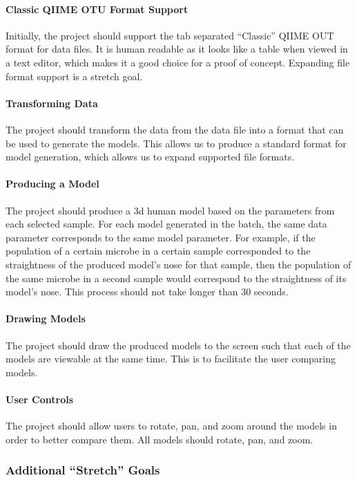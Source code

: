 \documentclass[letterpaper,10pt, onecolumn, draftclsnofoot]{IEEEtran}
\begin{document}
\paragraph{Classic QIIME OTU Format Support}
Initially, the project should support the tab separated ``Classic'' QIIME OUT format for data files. It is human readable as it looks like a table when viewed in a text editor, which makes it a good choice for a proof of concept. Expanding file format support is a stretch goal. 

\paragraph{Transforming Data}
The project should transform the data from the data file into a format that can be used to generate the models. This allows us to produce a standard format for model generation, which allows us to expand supported file formats.

\paragraph{Producing a Model}
The project should produce a 3d human model based on the parameters from each selected sample. For each model generated in the batch, the same data parameter corresponds to the same model parameter. For example, if the population of a certain microbe in a certain sample corresponded to the straightness of the produced model's nose for that sample, then the population of the same microbe in a second sample would correspond to the straightness of its model's nose. This process should not take longer than 30 seconds.

\paragraph{Drawing Models}
The project should draw the produced models to the screen such that each of the models are viewable at the same time. This is to facilitate the user comparing models.

\paragraph{User Controls}
The project should allow users to rotate, pan, and zoom around the models in order to better compare them. All models should rotate, pan, and zoom.

\subsubsection{Additional ``Stretch'' Goals}
\end{document}
